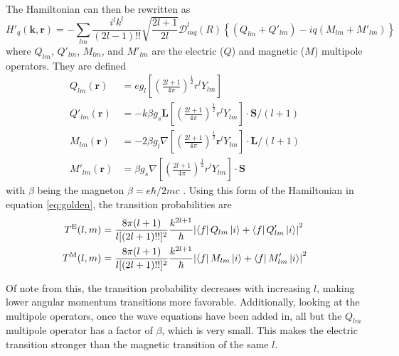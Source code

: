 The Hamiltonian can then be rewritten as
\begin{equation}
    H'_q(\boldsymbol{k},\boldsymbol{r})=-\sum_{lm}\frac{i^lk^l}{(2l-1)!!}\sqrt{\frac{2l+1}{2l}}\mathscr{D}^l_{mq}(R)\left\{\left(Q_{lm}+Q'_{lm}\right)-iq\left(M_{lm}+M'_{lm}\right)\right\}
\end{equation}
where $Q_{lm}$, $Q'_{lm}$, $M_{lm}$, and $M'_{lm}$ are the electric ($Q$) and magnetic ($M$) multipole operators. They are defined
\begin{subequations}
\label{eq:multipole_moment}
\begin{align}
    Q_{lm}(\boldsymbol{r}) & = eg_l \left[\left(\frac{2l+1}{4\pi}\right)^{\frac{1}{2}} r^l Y_{lm}\right]\\
    Q'_{lm}(\boldsymbol{r}) & = -k\beta g_s\boldsymbol{L}\left[\left(\frac{2l+1}{4\pi}\right)^{\frac{1}{2}} r^l Y_{lm}\right]\cdot\boldsymbol{S}/(l+1) \\
    M_{lm}(\boldsymbol{r})& = -2\beta g_l\nabla\left[\left(\frac{2l+1}{4\pi}\right)^{\frac{1}{2}} \boldsymbol{r}^l Y_{lm}\right]\cdot\boldsymbol{L}/(l+1) \\
    M'_{lm}(\boldsymbol{r}) & = \beta g_s\nabla\left[\left(\frac{2l+1}{4\pi}\right)^{\frac{1}{2}} r^l Y_{lm}\right]\cdot\boldsymbol{S}
\end{align}
\end{subequations}
with $\beta$ being the magneton $\beta = e\hbar/2mc$ \citep{brink93:_emradiation}.
Using this form of the Hamiltonian in equation \ref{eq:golden}, the transition probabilities are
\begin{subequations}
\begin{align}
    T^\text{E}(l,m) & = \frac{8\pi(l+1)}{l[(2l+1)!!]^2}\frac{k^{2l+1}}{\hbar}\abs{\bra{f}Q_{lm}\ket{i}+\bra{f}Q'_{lm}\ket{i}}^2 \\
    T^\text{M}(l,m) & = \frac{8\pi(l+1)}{l[(2l+1)!!]^2}\frac{k^{2l+1}}{\hbar}\abs{\bra{f}M_{lm}\ket{i}+\bra{f}M'_{lm}\ket{i}}^2
\end{align}
\end{subequations}

Of note from this, the transition probability decreases with increasing $l$, making lower angular momentum transitions more favorable. Additionally, looking at the multipole operators, once the wave equations have been added in, all but the $Q_{lm}$ multipole operator has a factor of $\beta$, which is very small. This makes the electric transition stronger than the magnetic transition of the same $l$.

